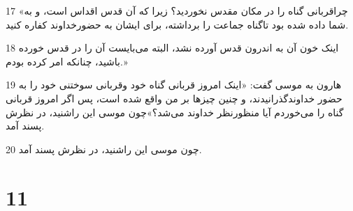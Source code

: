 \par 17 «چراقربانی گناه را در مکان مقدس نخوردید؟ زیرا که آن قدس اقداس است، و به شما داده شده بود تاگناه جماعت را برداشته، برای ایشان به حضورخداوند کفاره کنید.
\par 18 اینک خون آن به اندرون قدس آورده نشد، البته می‌بایست آن را در قدس خورده باشید، چنانکه امر کرده بودم.»
\par 19 هارون به موسی گفت: «اینک امروز قربانی گناه خود وقربانی سوختنی خود را به حضور خداوندگذرانیدند، و چنین چیزها بر من واقع شده است، پس اگر امروز قربانی گناه را می‌خوردم آیا منظورنظر خداوند می‌شد؟»چون موسی این راشنید، در نظرش پسند آمد. 
\par 20 چون موسی این راشنید، در نظرش پسند آمد.
 
\chapter{11}

